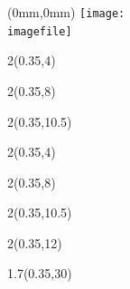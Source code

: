 \begin{textblock*}{\paperwidth}(0mm,0mm)
  \texttt{[image: \\imagefile]}
\end{textblock*}

\begin{textblock*}{2\TPHorizModule}(0.35\TPHorizModule,4\TPVertModule)
  \textcolor{white}{\titlefmt}
\end{textblock*}

\begin{textblock*}{2\TPHorizModule}(0.35\TPHorizModule,8\TPVertModule)
  \textcolor{white}{\parttitlefmt}
\end{textblock*}

\begin{textblock*}{2\TPHorizModule}(0.35\TPHorizModule,10.5\TPVertModule)
  \textcolor{white}{\authorfmt}
\end{textblock*}

\null\cleardoublepage


\begin{textblock*}{2\TPHorizModule}(0.35\TPHorizModule,4\TPVertModule)
  \titlefmt
\end{textblock*}

\begin{textblock*}{2\TPHorizModule}(0.35\TPHorizModule,8\TPVertModule)
  \parttitlefmt
\end{textblock*}

\begin{textblock*}{2\TPHorizModule}(0.35\TPHorizModule,10.5\TPVertModule)
  \authorfmt
\end{textblock*}

\begin{textblock*}{2\TPHorizModule}(0.35\TPHorizModule,12\TPVertModule)
  \affiliation
\end{textblock*}

\begin{textblock*}{1.7\TPHorizModule}(0.35\TPHorizModule,30\TPVertModule)
  \edition
\end{textblock*}
\endgroup
